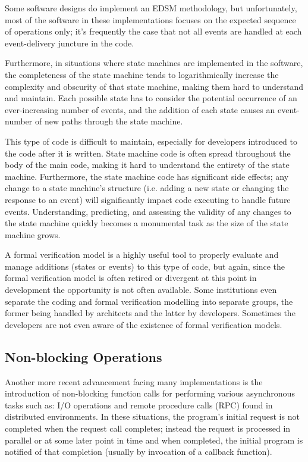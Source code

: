 Some software designs do implement an EDSM methodology, but
unfortunately, most of the software in these implementations focuses
on the expected sequence of operations only; it's frequently the case
that not all events are handled at each event-delivery juncture in the
code.

Furthermore, in situations where state machines are implemented in the
software, the completeness of the state machine tends to
logarithmically increase the complexity and obscurity of that state
machine, making them hard to understand and maintain.  Each possible
state has to consider the potential occurrence of an ever-increasing
number of events, and the addition of each state causes an
event-number of new paths through the state machine.

This type of code is difficult to maintain, especially for developers
introduced to the code after it is written.  State machine code is
often spread throughout the body of the main code, making it hard to
understand the entirety of the state machine.  Furthermore, the state
machine code has significant side effects; any change to a state
machine's structure (i.e. adding a new state or changing the response
to an event) will significantly impact code executing to handle future
events.  Understanding, predicting, and assessing the validity of any
changes to the state machine quickly becomes a monumental task as the
size of the state machine grows.

A formal verification model is a highly useful tool to properly
evaluate and manage additions (states or events) to this type of code,
but again, since the formal verification model is often retired or
divergent at this point in development the opportunity is not often
available.  Some institutions even separate the coding and formal
verification modelling into separate groups, the former being handled
by architects and the latter by developers.  Sometimes the developers
are not even aware of the existence of formal verification models.

\subsection{Non-blocking Operations}

Another more recent advancement facing many implementations is the
introduction of non-blocking function calls for performing various
asynchronous tasks such as: I/O operations and remote procedure calls
(RPC) found in distributed environments.  In these situations, the
program's initial request is not completed when the request call
completes; instead the request is processed in parallel or at some
later point in time and when completed, the initial program is
notified of that completion (usually by invocation of a callback
function).

